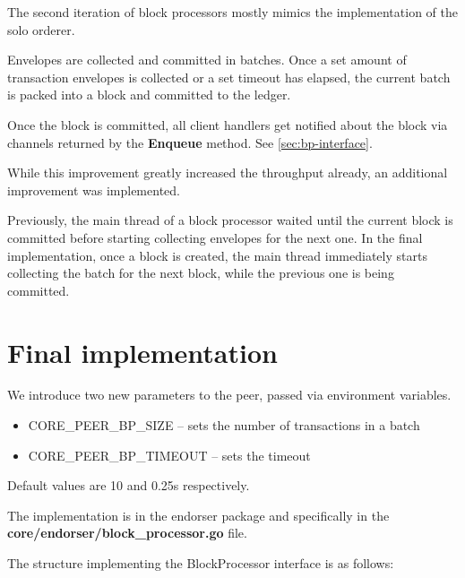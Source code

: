 The second iteration of block processors mostly mimics the implementation of the solo orderer.

Envelopes are collected and committed in batches. Once a set amount of transaction envelopes is collected or a set timeout has elapsed, the current batch is packed into a block and committed to the ledger.

Once the block is committed, all client handlers get notified about the block via channels returned by the \textbf{Enqueue} method. See \ref{sec:bp-interface}.

While this improvement greatly increased the throughput already, an additional improvement was implemented.

Previously, the main thread of a block processor waited until the current block is committed before starting collecting envelopes for the next one. In the final implementation, once a block is created, the main thread immediately starts collecting the batch for the next block, while the previous one is being committed.

\section{Final implementation}\label{sec:bp-fin}
We introduce two new parameters to the peer, passed via environment variables.

\begin{itemize}
  \item CORE\_PEER\_BP\_SIZE -- sets the number of transactions in a batch
  \item CORE\_PEER\_BP\_TIMEOUT -- sets the timeout
\end{itemize}

Default values are 10 and 0.25s respectively.

The implementation is in the endorser package and specifically in the
\textbf{core/endorser/block\_processor.go} file.

\newpage
The structure implementing the BlockProcessor interface is as follows:

